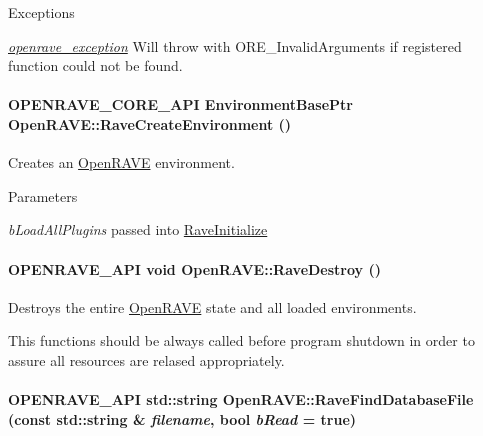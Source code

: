 \begin{DoxyExceptions}{Exceptions}
\item[{\em \hyperlink{classOpenRAVE_1_1openrave__exception}{openrave\_\-exception}}]Will throw with ORE\_\-InvalidArguments if registered function could not be found. \end{DoxyExceptions}
\hypertarget{namespaceOpenRAVE_aec9c3dd6a1f2908a1eb84ca59243e00a}{
\paragraph[{RaveCreateEnvironment}]{\setlength{\rightskip}{0pt plus 5cm}OPENRAVE\_\-CORE\_\-API EnvironmentBasePtr OpenRAVE::RaveCreateEnvironment ()}\hfill}
\label{namespaceOpenRAVE_aec9c3dd6a1f2908a1eb84ca59243e00a}
Creates an \hyperlink{namespaceOpenRAVE}{OpenRAVE} environment. 
\begin{DoxyParams}{Parameters}
\item[{\em bLoadAllPlugins}]passed into \hyperlink{namespaceOpenRAVE_a85619ef1740cd97d7dcb5ef306243a75}{RaveInitialize} \end{DoxyParams}
\hypertarget{namespaceOpenRAVE_abfafe0fbe621c9be55912937f08104df}{
\paragraph[{RaveDestroy}]{\setlength{\rightskip}{0pt plus 5cm}OPENRAVE\_\-API void OpenRAVE::RaveDestroy ()}\hfill}
\label{namespaceOpenRAVE_abfafe0fbe621c9be55912937f08104df}


Destroys the entire \hyperlink{namespaceOpenRAVE}{OpenRAVE} state and all loaded environments. 

This functions should be always called before program shutdown in order to assure all resources are relased appropriately. \hypertarget{namespaceOpenRAVE_a3faf74c6f78a579f18995764df3142e5}{
\paragraph[{RaveFindDatabaseFile}]{\setlength{\rightskip}{0pt plus 5cm}OPENRAVE\_\-API std::string OpenRAVE::RaveFindDatabaseFile (const std::string \& {\em filename}, \/  bool {\em bRead} = {\ttfamily true})}\hfill}
\label{namespaceOpenRAVE_a3faf74c6f78a579f18995764df3142e5}


